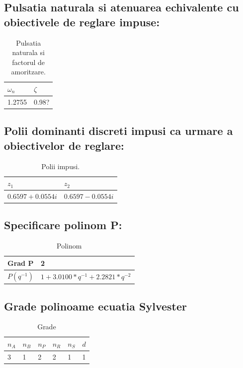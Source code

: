 \documentclass[12pt,english]{article}
\begin{document}
\subsection {Pulsatia naturala si atenuarea echivalente cu obiectivele de reglare impuse: }
\begin{table}[H]
  \centering
    \begin{tabular}{|l|l|}
      \hline
      $\omega_n$ & $\zeta$ \\
      \hline
      1.2755 & 0.98? \\
      \hline
    \end{tabular}
    \caption{Pulsatia naturala si factorul de amoritzare.}
\end{table}

\subsection {Polii dominanti discreti impusi ca urmare a obiectivelor de reglare: }
\begin{table}[H]
  \centering
    \begin{tabular}{|l|l|}
      \hline
      $z_1$ & $z_2$ \\
      \hline
      $0.6597 + 0.0554i$ & $0.6597 - 0.0554i$ \\
      \hline
    \end{tabular}
    \caption{Polii impusi.}
\end{table}

\subsection {Specificare polinom P: }
\begin{table}[H]
  \centering
    \begin{tabular}{|l|l|}
      \hline
      Grad P & 2 \\
      \hline
      $P(q^{-1})$ & $1 + 3.0100*q^{-1} + 2.2821*q^{-2}$ \\
      \hline
    \end{tabular}
    \caption{Polinom}
\end{table}

\subsection {Grade polinoame ecuatia Sylvester }
\begin{table}[H]
  \centering
    \begin{tabular}{|l|l|l|l|l|l|}
      \hline
      $n_A$ & $n_B$ & $n_P$ & $n_R$ & $n_S$ & $d$ \\
      \hline
      3 & 1 & 2 & 2 & 1 & 1 \\
      \hline
    \end{tabular}
    \caption{Grade}
\end{table}
\end{document}
